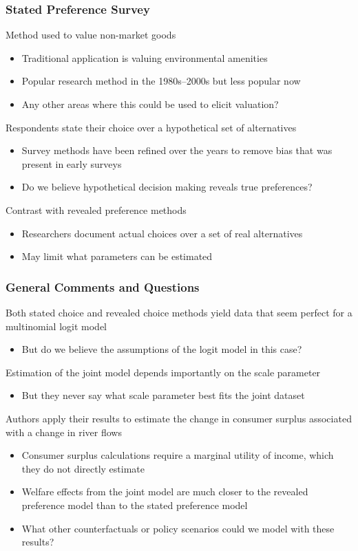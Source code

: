 \documentclass{beamer}
\begin{document}
\begin{frame}\frametitle{Stated Preference Survey}
    Method used to value non-market goods
    \begin{itemize}
    	\item Traditional application is valuing environmental amenities
    	\item Popular research method in the 1980s--2000s but less popular now
    	\item Any other areas where this could be used to elicit valuation?
    \end{itemize}
    \vspace{2ex}
    Respondents state their choice over a hypothetical set of alternatives
    \begin{itemize}
    	\item Survey methods have been refined over the years to remove bias that was present in early surveys
    	\item Do we believe hypothetical decision making reveals true preferences?
    \end{itemize}
    \vspace{2ex}
    Contrast with revealed preference methods
    \begin{itemize}
    	\item Researchers document actual choices over a set of real alternatives
    	\item May limit what parameters can be estimated
    \end{itemize}
\end{frame}

\begin{frame}\frametitle{General Comments and Questions}
    Both stated choice and revealed choice methods yield data that seem perfect for a multinomial logit model
    \begin{itemize}
    	\item But do we believe the assumptions of the logit model in this case?
    \end{itemize}
    \vspace{2ex}
    Estimation of the joint model depends importantly on the scale parameter
    \begin{itemize}
    	\item But they never say what scale parameter best fits the joint dataset
    \end{itemize}
    \vspace{2ex}
    Authors apply their results to estimate the change in consumer surplus associated with a change in river flows
    \begin{itemize}
    	\item Consumer surplus calculations require a marginal utility of income, which they do not directly estimate
    	\item Welfare effects from the joint model are much closer to the revealed preference model than to the stated preference model
    	\item What other counterfactuals or policy scenarios could we model with these results?
    \end{itemize}
\end{frame}
\end{document}
